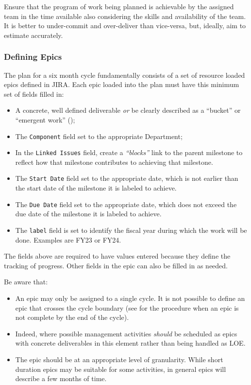 Ensure that the program of work being planned is achievable by the assigned team in the time available also considering the skills and availability of the team.
It is better to under-commit and over-deliver than vice-versa, but, ideally, aim to estimate accurately.

\subsubsection{Defining Epics} \label{sec:planning-epics}

The plan for a six month \gls{cycle} fundamentally consists of a set of resource loaded \glspl{epic} defined in \gls{JIRA}.
Each \gls{epic} loaded into the plan must have this minimum set of fields filled in:

\begin{itemize}
\item A concrete, well defined deliverable \emph{or} be clearly described as a ``bucket'' or ``emergent work'' ();
\item The \texttt{Component} field set to the appropriate Department;
\item In the \texttt{Linked Issues} field, create a \textit{``blocks''} link to the parent milestone to reflect how that milestone contributes to achieving that milestone.
\item The \texttt{Start Date} field set to the appropriate date, which is not earlier than the start date of the milestone it is labeled to achieve.
\item The \texttt{Due Date} field set to the appropriate date, which does not exceed the due date of the milestone it is labeled to achieve.
\item The \texttt{label} field is set to identify the fiscal year during which the work will be done. Examples are \gls{FY23} or \gls{FY24}.

\end{itemize}
The fields above are required to have values entered because they define the tracking of progress. Other fields in the \gls{epic} can also be filled in as needed.

Be aware that:

\begin{itemize}
\item An \gls{epic} may only be assigned to a single \gls{cycle}.
  It is not possible to define an \gls{epic} that crosses the \gls{cycle} boundary (see  for the procedure when an \gls{epic} is not complete by the end of the \gls{cycle}).
\item Indeed, where possible management activities \emph{should} be scheduled as \glspl{epic} with concrete deliverables in this \gls{element} rather than being handled as \gls{LOE}.
\item The \gls{epic} should be at an appropriate level of granularity.
  While short duration \glspl{epic} may be suitable for some activities, in general \glspl{epic} will describe a few months of time.
\end{itemize}

